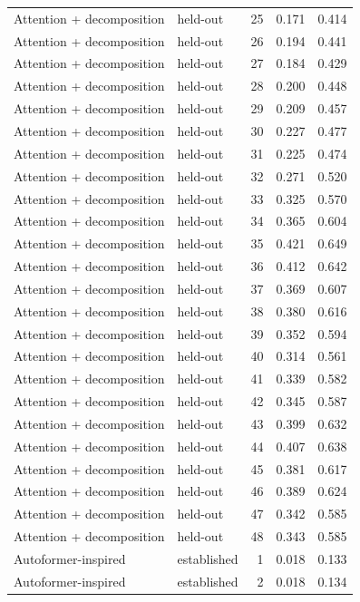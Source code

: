 \begin{tabular}{llrrr}
Attention + decomposition & held-out & 25 & 0.171 & 0.414 \\
Attention + decomposition & held-out & 26 & 0.194 & 0.441 \\
Attention + decomposition & held-out & 27 & 0.184 & 0.429 \\
Attention + decomposition & held-out & 28 & 0.200 & 0.448 \\
Attention + decomposition & held-out & 29 & 0.209 & 0.457 \\
Attention + decomposition & held-out & 30 & 0.227 & 0.477 \\
Attention + decomposition & held-out & 31 & 0.225 & 0.474 \\
Attention + decomposition & held-out & 32 & 0.271 & 0.520 \\
Attention + decomposition & held-out & 33 & 0.325 & 0.570 \\
Attention + decomposition & held-out & 34 & 0.365 & 0.604 \\
Attention + decomposition & held-out & 35 & 0.421 & 0.649 \\
Attention + decomposition & held-out & 36 & 0.412 & 0.642 \\
Attention + decomposition & held-out & 37 & 0.369 & 0.607 \\
Attention + decomposition & held-out & 38 & 0.380 & 0.616 \\
Attention + decomposition & held-out & 39 & 0.352 & 0.594 \\
Attention + decomposition & held-out & 40 & 0.314 & 0.561 \\
Attention + decomposition & held-out & 41 & 0.339 & 0.582 \\
Attention + decomposition & held-out & 42 & 0.345 & 0.587 \\
Attention + decomposition & held-out & 43 & 0.399 & 0.632 \\
Attention + decomposition & held-out & 44 & 0.407 & 0.638 \\
Attention + decomposition & held-out & 45 & 0.381 & 0.617 \\
Attention + decomposition & held-out & 46 & 0.389 & 0.624 \\
Attention + decomposition & held-out & 47 & 0.342 & 0.585 \\
Attention + decomposition & held-out & 48 & 0.343 & 0.585 \\
Autoformer-inspired & established & 1 & 0.018 & 0.133 \\
Autoformer-inspired & established & 2 & 0.018 & 0.134 \\

\end{tabular}
